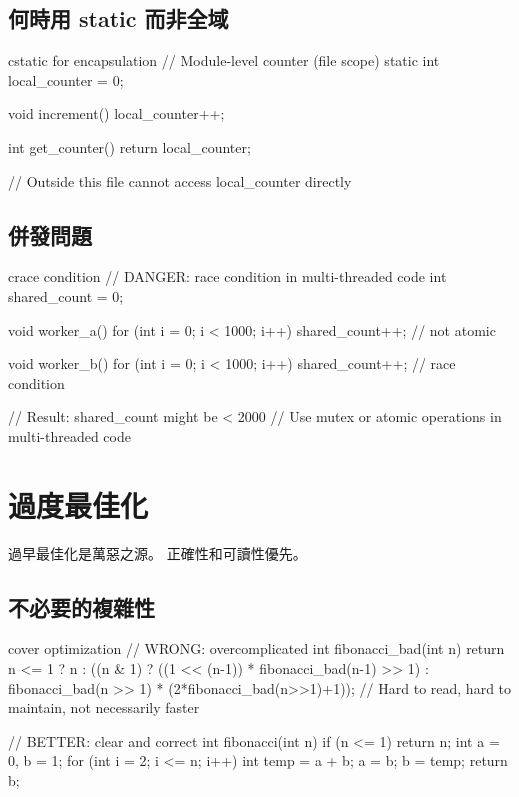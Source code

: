 \subsection*{何時用 static 而非全域}

\begin{code}{c}{static for encapsulation}
// Module-level counter (file scope)
static int local_counter = 0;

void increment() {
    local_counter++;
}

int get_counter() {
    return local_counter;
}

// Outside this file cannot access local_counter directly
\end{code}

\subsection*{併發問題}

\begin{code}{c}{race condition}
// DANGER: race condition in multi-threaded code
int shared_count = 0;

void worker_a() {
    for (int i = 0; i < 1000; i++) {
        shared_count++;  // not atomic
    }
}

void worker_b() {
    for (int i = 0; i < 1000; i++) {
        shared_count++;  // race condition
    }
}

// Result: shared_count might be < 2000
// Use mutex or atomic operations in multi-threaded code
\end{code}


\section{過度最佳化}

過早最佳化是萬惡之源。 正確性和可讀性優先。

\subsection*{不必要的複雜性}

\begin{code}{c}{over optimization}
// WRONG: overcomplicated
int fibonacci_bad(int n) {
    return n <= 1 ? n :
           ((n & 1) ? 
            ((1 << (n-1)) * fibonacci_bad(n-1) >> 1) :
            fibonacci_bad(n >> 1) * (2*fibonacci_bad(n>>1)+1));
    // Hard to read, hard to maintain, not necessarily faster
}

// BETTER: clear and correct
int fibonacci(int n) {
    if (n <= 1) return n;
    int a = 0, b = 1;
    for (int i = 2; i <= n; i++) {
        int temp = a + b;
        a = b;
        b = temp;
    }
    return b;
}
\end{code}

